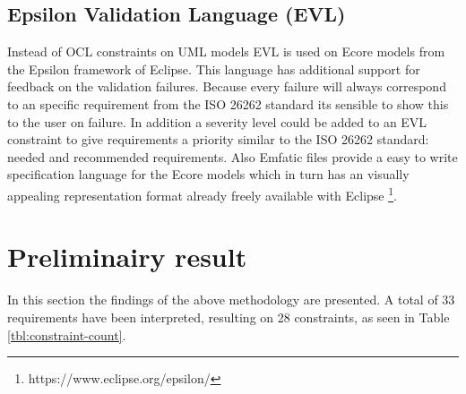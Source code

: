 \documentclass[a4paper]{article}
\newcommand{\ISO}{ISO 26262 standard\xspace}
\begin{document}
\subsection{Epsilon Validation Language (EVL)}
Instead of OCL constraints on UML models EVL is used on Ecore models from the Epsilon framework of Eclipse.
This language has additional support for feedback on the validation failures.
Because every failure will always correspond to an specific requirement from the \ISO its sensible to show this to the user on failure.
In addition a severity level could be added to an EVL constraint to give requirements a priority similar to the \ISO: needed and recommended requirements. \cite{Kolovos2009}
Also Emfatic files provide a easy to write specification language for the Ecore models which in turn has an visually appealing representation format already freely available with Eclipse \footnote{https://www.eclipse.org/epsilon/}.


\section{Preliminairy result} \label{sec:result}
In this section the findings of the above methodology are presented.
A total of 33 requirements have been interpreted, resulting on 28 constraints, as seen in Table \ref{tbl:constraint-count}.
\end{document}
